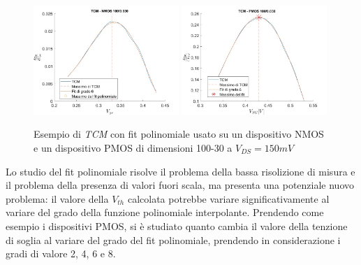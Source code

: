 \documentclass[12pt, letterpaper]{book}
\begin{document}
\begin{figure}[h!]
\centering
 \includegraphics[width=0.49\textwidth]{TCM-N4-100-30}
 \includegraphics[width=0.49\textwidth]{TCM-P1-100-30}
 \caption{Esempio di \emph{TCM} con fit polinomiale usato su un dispositivo NMOS e un dispositivo PMOS di dimensioni 100-30 a $V_{DS} = 150 mV$}
\end{figure}

Lo studio del fit polinomiale risolve il problema della bassa risolizione di misura e il problema della presenza di valori fuori scala, ma presenta una potenziale nuovo problema: il valore della $V_{th}$ calcolata potrebbe variare significativamente al variare del grado della funzione polinomiale interpolante. 
Prendendo come esempio i dispositivi PMOS, si è studiato quanto cambia il valore della tenzione di soglia al variare del grado del fit polinomiale, prendendo in considerazione i gradi di valore 2, 4, 6 e 8.\\
\end{document}
